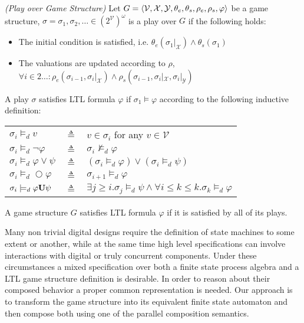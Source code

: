 \begin{definition}
	\label{def:GS_play} \emph{(Play over Game Structure)} 
	Let $G =  \langle {\mathcal{V}}, {\mathcal{X}}, {\mathcal{Y}}, {\theta_e}, {\theta_s}, {\rho_e}, {\rho_s}, \varphi \rangle$ be a game structure, $\sigma = \sigma_1,\sigma_2,\ldots \in (2^{\mathcal{V}})^\omega$ is a play over $G$ if the following holds:
	\begin{itemize} 
		\item The initial condition is satisfied, i.e. $\theta_e(\sigma_1|_{\mathcal{X}}) \wedge \theta_s(\sigma_1)$
		\item The valuations are updated according to $\rho$,
		 $\forall i \in 2\ldots: \rho_e(\sigma_{i-1}, \sigma_i|_{\mathcal{X}}) \wedge \rho_s(\sigma_{i-1}, \sigma_i|_{\mathcal{X}},\sigma_i|_{\mathcal{Y}})$		
	\end{itemize}
\end{definition}

A play $\sigma$ satisfies LTL formula $\varphi$  if $\sigma_1 \models \varphi$ according to the following inductive definition:

\begin{tabular}{ l c l }
	$\sigma_i \models_d v$ & $\triangleq$ & $v \in \sigma_i$ for any $v \in \mathcal{V}$\\	
	$\sigma_i \models_d \neg \varphi$ & $\triangleq$ & $\sigma_i \not\models_d \varphi$\\
	$\sigma_i \models_d \varphi \vee \psi$ & $\triangleq$ & $(\sigma_i \models_d \varphi) \vee (\sigma_i \models_d \psi)$\\
	$\sigma_i \models_d \bigcirc \varphi$ & $\triangleq$ & $\sigma_{i+1} \models_d \varphi$\\
	$\sigma_i \models_d \varphi {\bf U} \psi$ & $\triangleq$ & $\exists j \geq i . \sigma_j \models_d \psi \wedge \forall i \leq k \le k. \sigma_k \models_d \varphi$\\
\end{tabular}

A game structure $G$ satisfies LTL formula $\varphi$ if it is satisfied by all of its plays.

Many non trivial digital designs require the definition of state machines to some extent or another, while at the same time high level specifications can involve interactions with digital or truly concurrent components. Under these circumstances a mixed specification over both a finite state process algebra and a LTL game structure definition is desirable.  In order to reason about their composed behavior a proper common representation is needed. Our approach is to transform the game structure into its equivalent finite state automaton and then compose both using one of the parallel composition semantics.


